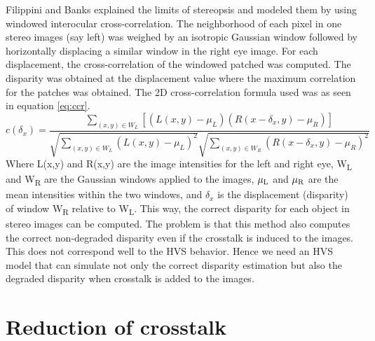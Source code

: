 Filippini and Banks \cite{filippini2009limits} explained the limits of stereopsis and modeled them by using windowed interocular cross-correlation. The neighborhood of each pixel in one stereo images (say left) was weighed by an isotropic Gaussian window followed by horizontally displacing a similar window in the right eye image. For each displacement, the cross-correlation of the windowed patched was computed. The disparity was obtained at the displacement value where the maximum correlation for the patches was obtained. The 2D cross-correlation formula used was as seen in equation \ref{eq:ccr}.
\begin{equation}
c(\delta_x) = \frac{ \sum\limits_{(x,y) \in W_L} [(L(x,y) - \mu_L)(R(x-\delta_x, y) - \mu_R)] }{\sqrt{\sum\limits_{(x,y) \in W_L}(L(x,y) - \mu_L)^2} \sqrt{\sum\limits_{(x,y) \in W_R}(R(x-\delta_x, y)- \mu_R)^2}}
\label{eq:ccr}
\end{equation}
Where L(x,y) and R(x,y) are the image intensities for the left and right eye, W\textsubscript{L} and W\textsubscript{R} are the Gaussian windows applied to the images, $\mu\textsubscript{L}$ and $\mu\textsubscript{R}$ are the mean intensities within the two windows, and $\delta_x$ is the displacement (disparity) of window W\textsubscript{R} relative to W\textsubscript{L}. This way, the correct disparity for each object in stereo images can be computed. The problem is that this method also computes the correct non-degraded disparity even if the crosstalk is induced to the images. This does not correspond well to the HVS behavior. Hence we need an HVS model that can simulate not only the correct disparity estimation but also the degraded disparity when crosstalk is added to the images.

\section{Reduction of crosstalk}

